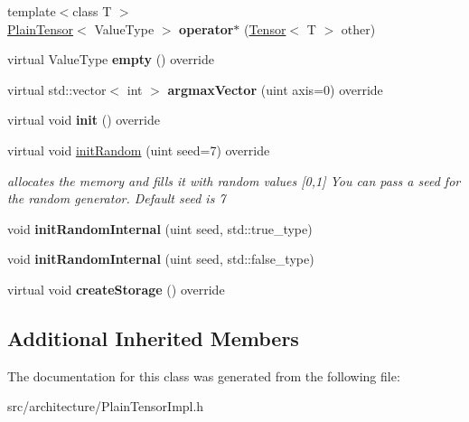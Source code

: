 \begin{DoxyCompactItemize}
\item 
\mbox{\label{classPlainTensor_a4561c68e4dc72afbdf6731b216238dd5}} 
{\footnotesize template$<$class T $>$ }\\\hyperlink{classPlainTensor}{Plain\+Tensor}$<$ Value\+Type $>$ {\bfseries operator$\ast$} (\hyperlink{classTensor}{Tensor}$<$ T $>$ other)
\item 
\mbox{\label{classPlainTensor_a2dc7be63356b8e36c0077a83bfed84e5}} 
virtual Value\+Type {\bfseries empty} () override
\item 
\mbox{\label{classPlainTensor_a127cced2a949308de4bbeab9448c1fa9}} 
virtual std\+::vector$<$ int $>$ {\bfseries argmax\+Vector} (uint axis=0) override
\item 
\mbox{\label{classPlainTensor_aed8bba6b79d8898d8c605f321fb051bb}} 
virtual void {\bfseries init} () override
\item 
\mbox{\label{classPlainTensor_a824aea45b509e48a94576522bc968a9c}} 
virtual void \hyperlink{classPlainTensor_a824aea45b509e48a94576522bc968a9c}{init\+Random} (uint seed=7) override
\begin{DoxyCompactList}\small\item\em allocates the memory and fills it with random values \mbox{[}0,1\mbox{]} You can pass a seed for the random generator. Default seed is 7 \end{DoxyCompactList}\item 
\mbox{\label{classPlainTensor_affbbb66a767c64926e1c5f6c7450b7e4}} 
void {\bfseries init\+Random\+Internal} (uint seed, std\+::true\+\_\+type)
\item 
\mbox{\label{classPlainTensor_a3c69c17b40efc0c1c615827d15167d0a}} 
void {\bfseries init\+Random\+Internal} (uint seed, std\+::false\+\_\+type)
\item 
\mbox{\label{classPlainTensor_ab4005307057fb776d0521d2edd6d505e}} 
virtual void {\bfseries create\+Storage} () override
\end{DoxyCompactItemize}
\subsection*{Additional Inherited Members}


The documentation for this class was generated from the following file\+:\begin{DoxyCompactItemize}
\item 
src/architecture/Plain\+Tensor\+Impl.\+h\end{DoxyCompactItemize}
